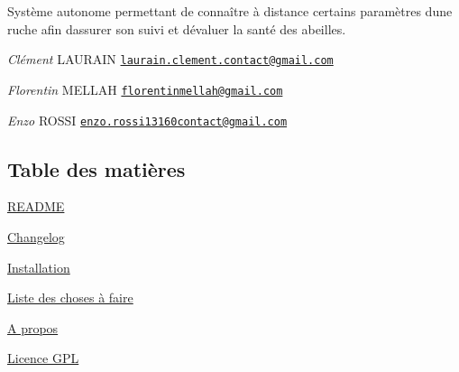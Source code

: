 Système autonome permettant de connaître à distance certains paramètres d\textquotesingle{}une ruche afin d\textquotesingle{}assurer son suivi et d\textquotesingle{}évaluer la santé des abeilles.

{\itshape Clément} L\+A\+U\+R\+A\+IN \href{mailto:laurain.clement.contact@gmail.com}{\tt laurain.\+clement.\+contact@gmail.\+com}

{\itshape Florentin} M\+E\+L\+L\+AH \href{mailto:florentinmellah@gmail.com}{\tt florentinmellah@gmail.\+com}

{\itshape Enzo} R\+O\+S\+SI \href{mailto:enzo.rossi13160contact@gmail.com}{\tt enzo.\+rossi13160contact@gmail.\+com}\hypertarget{index_section_tdm}{}\subsection{Table des matières}\label{index_section_tdm}

\begin{DoxyItemize}
\item \hyperlink{page__r_e_a_d_m_e}{R\+E\+A\+D\+ME}
\item \hyperlink{page_changelog}{Changelog}
\item \hyperlink{page_install}{Installation}
\item \hyperlink{todo}{Liste des choses à faire}
\item \hyperlink{page_about}{A propos}
\item \hyperlink{page_licence}{Licence G\+PL} 
\end{DoxyItemize}